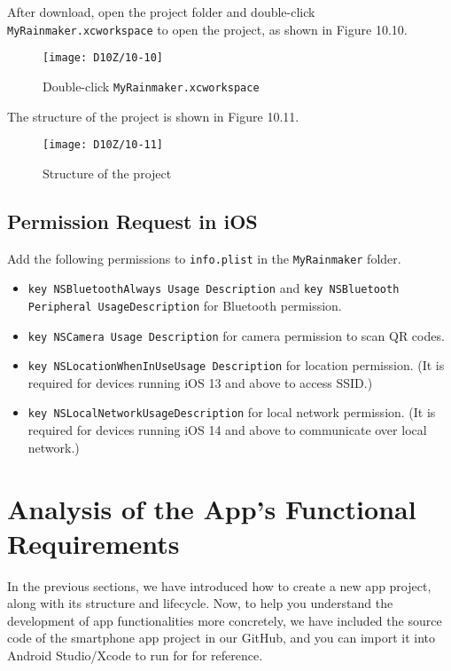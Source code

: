 \documentclass[a4paper,12pt]{book}
\begin{document}
After download, open the project folder and double-click \verb|MyRainmaker.xcworkspace| to open the project, as shown in Figure 10.10.

\begin{figure}[ht]
    \centering
    \texttt{[image: D10Z/10-10]}
    \caption{Double-click \texttt{MyRainmaker.xcworkspace}}
\end{figure}

The structure of the project is shown in Figure 10.11.

\begin{figure}[h!]
    \centering
    \texttt{[image: D10Z/10-11]}
    \caption{Structure of the project}
\end{figure}

\subsection{Permission Request in iOS}
Add the following permissions to \verb|info.plist| in the \verb|MyRainmaker| folder.

\begin{itemize}
    \item \verb|key NSBluetoothAlways Usage Description| and \verb|key NSBluetooth|\\
    \verb|Peripheral UsageDescription| for Bluetooth permission.
    \item \verb|key NSCamera Usage Description| for camera permission to scan QR codes.
    \item \verb|key NSLocationWhenInUseUsage Description| for location permission. (It is required for devices running iOS 13 and above to access SSID.)
    \item \verb|key NSLocalNetworkUsageDescription| for local network permission. (It is required for devices running iOS 14 and above to communicate over local network.)
\end{itemize}

\section{Analysis of the App’s Functional Requirements}
In the previous sections, we have introduced how to create a new app project, along with its structure and lifecycle. Now, to help you understand the development of app functionalities more concretely, we have included the source code of the smartphone app project in our GitHub, and you can import it into Android Studio/Xcode to run for for reference.
\end{document}
